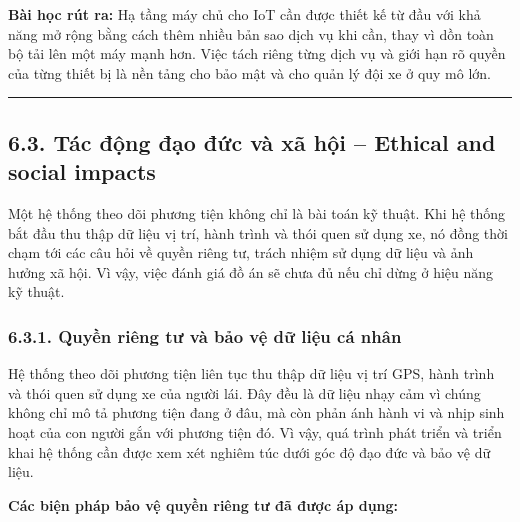 \documentclass[a4paper]{extarticle}
\begin{document}
\textbf{Bài học rút ra:} Hạ tầng máy chủ cho IoT cần được thiết kế từ
đầu với khả năng mở rộng bằng cách thêm nhiều bản sao dịch vụ khi cần,
thay vì dồn toàn bộ tải lên một máy mạnh hơn. Việc tách riêng từng dịch
vụ và giới hạn rõ quyền của từng thiết bị là nền tảng cho bảo mật và cho
quản lý đội xe ở quy mô lớn.

\begin{center}\rule{0.5\linewidth}{0.5pt}\end{center}

\subsection{6.3. Tác động đạo đức và xã hội -- Ethical and social impacts}\label{63-tuxe1c-ux111ux1ed9ng-ux111ux1ea1o-ux111ux1ee9c-vuxe0-xuxe3-hux1ed9i--ethical-and-social-impacts}

Một hệ thống theo dõi phương tiện không chỉ là bài toán kỹ thuật. Khi hệ
thống bắt đầu thu thập dữ liệu vị trí, hành trình và thói quen sử dụng
xe, nó đồng thời chạm tới các câu hỏi về quyền riêng tư, trách nhiệm sử
dụng dữ liệu và ảnh hưởng xã hội. Vì vậy, việc đánh giá đồ án sẽ chưa đủ
nếu chỉ dừng ở hiệu năng kỹ thuật.

\subsubsection{6.3.1. Quyền riêng tư và bảo vệ dữ liệu cá
nhân}\label{631-quyux1ec1n-riuxeang-tux1b0-vuxe0-bux1ea3o-vux1ec7-dux1eef-liux1ec7u-cuxe1-nhuxe2n}

Hệ thống theo dõi phương tiện liên tục thu thập dữ liệu vị trí GPS, hành
trình và thói quen sử dụng xe của người lái. Đây đều là dữ liệu nhạy cảm
vì chúng không chỉ mô tả phương tiện đang ở đâu, mà còn phản ánh hành vi
và nhịp sinh hoạt của con người gắn với phương tiện đó. Vì vậy, quá trình
phát triển và triển khai hệ thống cần được xem xét nghiêm túc dưới góc
độ đạo đức và bảo vệ dữ liệu.

\textbf{Các biện pháp bảo vệ quyền riêng tư đã được áp dụng:}
\end{document}
